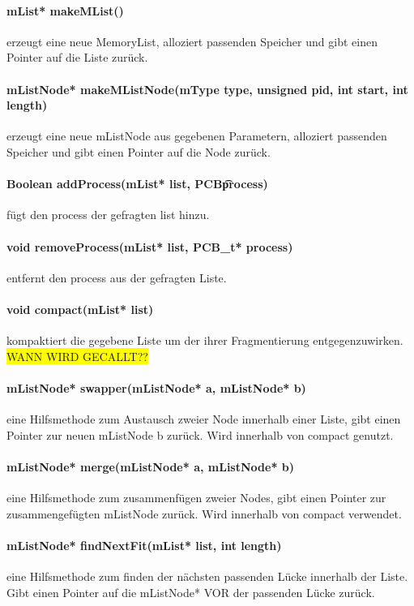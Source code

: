 \paragraph{mList* makeMList()} erzeugt eine neue MemoryList, alloziert passenden Speicher und gibt einen Pointer auf die Liste zurück.

\paragraph{mListNode* makeMListNode(mType type, unsigned pid, int start, int length)} erzeugt eine neue mListNode aus gegebenen Parametern, alloziert passenden Speicher und gibt einen Pointer auf die Node zurück.

\paragraph{Boolean addProcess(mList* list, PCB\t* process)} fügt den process der gefragten list hinzu.

\paragraph{void removeProcess(mList* list, PCB\_t* process)} entfernt den process aus der gefragten Liste.

\paragraph{void compact(mList* list)} kompaktiert die gegebene Liste um der ihrer Fragmentierung entgegenzuwirken. \colorbox{yellow}{WANN WIRD GECALLT??}

\paragraph{mListNode* swapper(mListNode* a, mListNode* b)} eine Hilfsmethode zum Austausch zweier Node innerhalb einer Liste, gibt einen Pointer zur neuen mListNode b zurück. Wird innerhalb von compact genutzt.

\paragraph{mListNode* merge(mListNode* a, mListNode* b)} eine Hilfsmethode zum zusammenfügen zweier Nodes, gibt einen Pointer zur zusammengefügten mListNode zurück. Wird innerhalb von compact verwendet.

\paragraph{mListNode* findNextFit(mList* list, int length)} eine Hilfsmethode zum finden der nächsten passenden Lücke innerhalb der Liste. Gibt einen Pointer auf die mListNode* VOR der passenden Lücke zurück.
